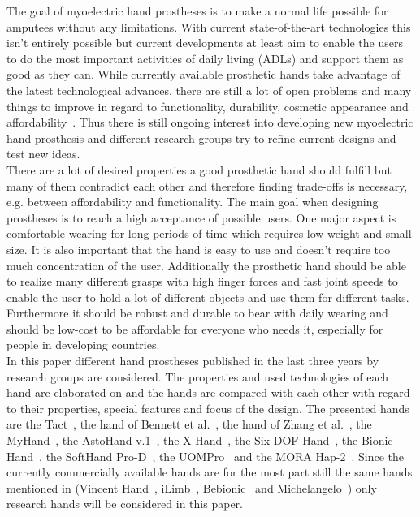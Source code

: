 \documentclass[a4paper, 10pt, conference]{ieeeconf}      %
\begin{document}
The goal of myoelectric hand prostheses is to make a normal life possible for amputees without any limitations. With current state-of-the-art technologies this isn't entirely possible but current developments at least aim to enable the users to do the most important activities of daily living (ADLs) and support them as good as they can. While currently available prosthetic hands take advantage of the latest technological advances, there are still a lot of open problems and many things to improve in regard to functionality, durability, cosmetic appearance and affordability~\cite{review}. Thus there is still ongoing interest into developing new myoelectric hand prosthesis and different research groups try to refine current designs and test new ideas.\\
There are a lot of desired properties a good prosthetic hand should fulfill but many of them contradict each other and therefore finding trade-offs is necessary, e.g. between affordability and functionality. The main goal when designing prostheses is to reach a high acceptance of possible users. One major aspect is comfortable wearing for long periods of time which requires low weight and small size. It is also important that the hand is easy to use and doesn't require too much concentration of the user. Additionally the prosthetic hand should be able to realize many different grasps with high finger forces and fast joint speeds to enable the user to hold a lot of different objects and use them for different tasks. Furthermore it should be robust and durable to bear with daily wearing and should be low-cost to be affordable for everyone who needs it, especially for people in developing countries.\\
In this paper different hand prostheses published in the last three years by research groups are considered. The properties and used technologies of each hand are elaborated on and the hands are compared with each other with regard to their properties, special features and focus of the design. The presented hands are the Tact~\cite{tact}, the hand of Bennett et al.~\cite{bennett}, the hand of Zhang et al.~\cite{zhang}, the MyHand~\cite{myhand}, the AstoHand v.1~\cite{astohand}, the X-Hand~\cite{xhand}, the Six-DOF-Hand~\cite{6dofhand}, the Bionic Hand~\cite{bionichand}, the SoftHand Pro-D~\cite{softhand}, the UOMPro~\cite{uompro} and the MORA Hap-2~\cite{morahap2}. Since the currently commercially available hands are for the most part still the same hands mentioned in\cite{review} (Vincent Hand~\cite{vincent}, iLimb~\cite{ilimb}, Bebionic~\cite{bebionic} and Michelangelo~\cite{michelangelo}) only research hands will be considered in this paper.
 
\end{document}
